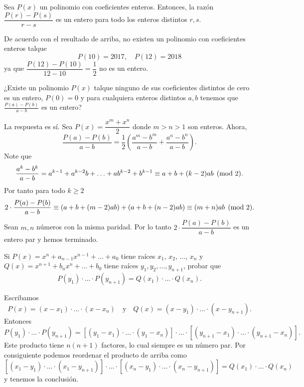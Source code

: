 \begin{theorem}{}{}
    Sea $P(x)$ un polinomio con coeficientes enteros.
    Entonces, la razón $\dfrac{P(r) - P(s)}{r - s}$ es un entero para todo los enteros distintos $r, s$.
\end{theorem}

De acuerdo con el resultado de arriba, no existen un polinomio con coeficientes enteros talque
\[
    P(10) = 2017, \quad P(12) = 2018
\]
ya que $\dfrac{P(12) - P(10)}{12 - 10} = \dfrac{1}{2}$ no es un entero.


\begin{example}
    ¿Existe un polinomio $P(x)$ talque ninguno de sus coeficientes distintos de cero es un entero, $P(0) = 0$ y para cualquiera enteros distintos $a,b$ tenemos que $\frac{P(a) - P(b)}{a - b}$ es un entero?
\end{example}
\begin{solution}
    La respuesta es sí.
    Sea $P(x) = \dfrac{x^m + x^n}{2}$ donde $m > n > 1$ son enteros.
    Ahora,
    \[
        \frac{P(a) - P(b)}{a - b} = \frac{1}{2} \left(\frac{a^m - b^m}{a - b} + \frac{a^n - b^n}{a - b}\right).
    \]
    Note que
    \[
        \frac{a^k - b^k}{a - b} = a^{k - 1} + a^{k - 2}b + \ldots + ab^{k - 2} + b^{k - 1} \equiv a + b + (k - 2)ab  \pmod{2}.
    \]
    Por tanto para todo $k \geq 2$
    \[
        2 \cdot \frac{P(a) - P(b)}{a - b} \equiv \left(a + b + (m - 2)ab\right) + \left(a + b + (n - 2)ab\right) \equiv (m + n)ab \pmod{2}.
    \]
    Sean $m,n$ números con la misma paridad.
    Por lo tanto $2 \cdot \dfrac{P(a) - P(b)}{a - b}$ es un entero par y hemos terminado.
\end{solution}


\begin{example}
    Si $P(x) = x^n + a_{n - 1} x^{n - 1} + \ldots + a_0$ tiene raíces $x_1$, $x_2$, $\ldots$, $x_n$ y $Q(x) = x^{n + 1} + b_n x^n + \ldots + b_0$ tiene raíces $y_1, y_2, \ldots, y_{n + 1}$, probar que
    \[
        P(y_1) \cdot \ldots \cdot P(y_{n + 1}) = Q(x_1) \cdot \ldots \cdot Q(x_n).
    \]
\end{example}
\begin{solution}
    Escribamos
    \[
        P(x) = (x - x_1) \cdot \ldots \cdot (x - x_n) \quad \text{y} \quad Q(x) = (x - y_1) \cdot \ldots \cdot (x - y_{n + 1}).
    \]
    Entonces
    \[
        P(y_1) \cdot \ldots \cdot P(y_{n + 1}) = \left[ (y_1 - x_1) \cdot \ldots \cdot (y_1 - x_n) \right] \cdot \ldots \cdot \left[ (y_{n + 1} - x_1) \cdot \ldots \cdot (y_{n + 1} - x_n) \right].
    \]
    Este producto tiene $n(n + 1)$ factores, lo cual siempre es un número par.
    Por consiguiente podemos reordenar el producto de arriba como
    \[
        \left[ (x_1 - y_1) \cdot \ldots \cdot (x_1 - y_{n + 1}) \right] \cdot \ldots \cdot \left[ (x_n - y_1) \cdot \ldots \cdot (x_n - y_{n + 1}) \right] =  Q(x_1) \cdot \ldots \cdot Q(x_n)
    \]
    y tenemos la conclusión.
\end{solution}


